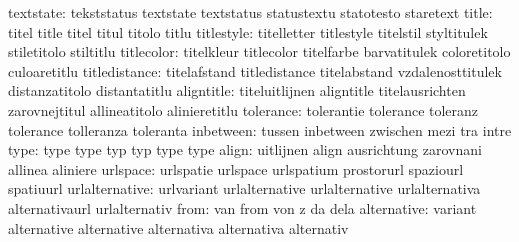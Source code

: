                 textstate: tekststatus               textstate
                           textstatus                statustextu
                           statotesto                staretext
                    title: titel                     title
                           titel                     titul
                           titolo                    titlu
               titlestyle: titelletter               titlestyle
                           titelstil                 styltitulek
                           stiletitolo               stiltitlu
               titlecolor: titelkleur                titlecolor
                           titelfarbe                barvatitulek
                           coloretitolo              culoaretitlu
            titledistance: titelafstand              titledistance
                           titelabstand              vzdalenosttitulek
                           distanzatitolo            distantatitlu
               aligntitle: titeluitlijnen            aligntitle
                           titelausrichten           zarovnejtitul
                           allineatitolo             alinieretitlu
                tolerance: tolerantie                tolerance
                           toleranz                  tolerance
                           tolleranza                toleranta
                inbetween: tussen                    inbetween
                           zwischen                  mezi
                           tra                       intre
                     type: type                      type
                           typ                       typ
                           type                      type %
                    align: uitlijnen                 align
                           ausrichtung               zarovnani
                           allinea                   aliniere
                 urlspace: urlspatie                 urlspace
                           urlspatium                prostorurl
                           spaziourl                 spatiuurl
           urlalternative: urlvariant                urlalternative
                           urlalternative            urlalternativa
                           alternativaurl            urlalternativ
                     from: van                       from
                           von                       z
                           da                        dela
              alternative: variant                   alternative
                           alternative               alternativa
                           alternativa               alternativ
